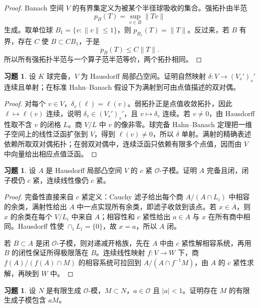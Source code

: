 \documentclass[11pt,a4paper,openany]{ctexbook}
\numberwithin{equation}{chapter}
\theoremstyle{plain}
\theoremstyle{definition}
\newtheorem{exercise}[theorem]{习题}
\theoremstyle{remark}
\begin{document}
\begin{proof}
Banach 空间 $V$ 的有界集定义为被某个半径球吸收的集合。强拓扑由半范
\[
  p_B(T)=\sup_{v\in B}\|Tv\|
\]
生成。取单位球 $B_1=\{v:\|v\|\le1\}$，则 $p_{B_1}(T)=\|T\|$。反过来，若 $B$ 有界，存在 $C$ 使 $B\subset C B_1$，于是
\[
  p_B(T)\le C\|T\|.
\]
所以所有强拓扑半范与一个算子范半范等价，两个拓扑相同。
\end{proof}

\begin{exercise}
设 $K$ 球完备，$V$ 为 Hausdorff 局部凸空间。证明自然映射 $\delta:V\to (V_s')_s'$ 连续且单射；在标准 Hahn--Banach 假设下为满射到可由点值描述的双对偶。
\end{exercise}

\begin{proof}
对每个 $v\in V$，$\delta_v(\ell)=\ell(v)$。弱拓扑正是点值收敛拓扑，因此 $\ell\mapsto\ell(v)$ 连续，说明 $\delta_v\in(V_s')_s'$，且 $v\mapsto\delta_v$ 连续。若 $v\ne0$，由 Hausdorff 性取不含 $v$ 的闭格 $L$。商 $V/L$ 中 $v$ 的像非零。球完备 Hahn--Banach 定理把一维子空间上的线性泛函扩张到 $V$，得到 $\ell(v)\ne0$，所以 $\delta$ 单射。满射的精确表述依赖所取双对偶拓扑；在弱双对偶中，连续泛函只依赖有限多个点值，因而由 $V$ 中向量给出相应点值泛函。
\end{proof}

\begin{exercise}
设 $A$ 是 Hausdorff 局部凸空间 $V$ 的 $c$ 紧 $\mathcal O$-子模。证明 $A$ 完备且闭，闭子模仍 $c$ 紧，连续线性像仍 $c$ 紧。
\end{exercise}

\begin{proof}
完备性直接来自 $c$ 紧定义：Cauchy 滤子给出每个商 $A/(A\cap L_i)$ 中相容的余类，满射性给出 $A$ 中一点实现所有余类，即滤子收敛到该点。若 $x\in\overline A$，则 $x$ 的余类在每个 $V/L_i$ 中来自 $A$；相容性和 $c$ 紧性给出 $a\in A$ 与 $x$ 在所有商中相同。Hausdorff 性使 $\cap_i L_i=\{0\}$，故 $x=a$，所以 $A$ 闭。

若 $B\subset A$ 是闭 $\mathcal O$-子模，则对递减开格族，先在 $A$ 中由 $c$ 紧性解相容系统，再用 $B$ 的闭性保证所得极限落在 $B$。连续线性映射 $f:V\to W$ 下，商 $f(A)/(f(A)\cap M)$ 的相容系统可拉回到 $A/(A\cap f^{-1}M)$，由 $A$ 的 $c$ 紧性求解，再映到 $W$ 中。
\end{proof}

\begin{exercise}
设 $N$ 是有限生成 $\mathcal O$-模，$M\subset N$，$a\in\mathcal O$ 且 $|a|<1$。证明存在 $M$ 的有限生成子模包含 $aM$。
\end{exercise}
\end{document}
